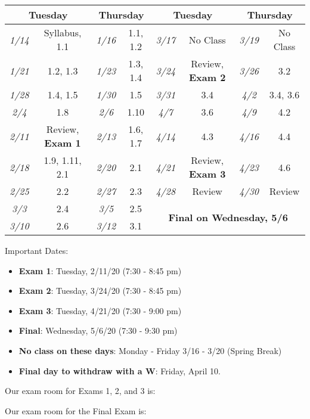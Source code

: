 \documentclass[notes]{subfiles}
\begin{document}
\begin{flushleft}
	\begin{center}
		\begin{tabular}{|c||c|c||c|c||c|c||c|}\hline
			\multicolumn{2}{|c|}{\textbf{Tuesday}} & \multicolumn{2}{c|}{\textbf{Thursday}} & \multicolumn{2}{c|}{\textbf{Tuesday}} & \multicolumn{2}{c|}{\textbf{Thursday}}\\ \hline

			\textit{1/14} & Syllabus, 1.1			&\textit{1/16} & 1.1, 1.2		&\textit{3/17}& No Class					&\textit{3/19}& No Class \\ \hline \hline
			\textit{1/21} & 1.2, 1.3				&\textit{1/23} & 1.3, 1.4		&\textit{3/24}& Review, \textbf{Exam 2}	&\textit{3/26}& 3.2\\ \hline \hline
			\textit{1/28} & 1.4, 1.5				&\textit{1/30} & 1.5			&\textit{3/31}& 3.4 						&\textit{4/2}& 3.4, 3.6\\ \hline \hline
			\textit{2/4} 	& 1.8 					&\textit{2/6}& 1.10			&\textit{4/7}	 & 3.6						&\textit{4/9}&  4.2\\ \hline \hline
			\textit{2/11} & Review, \textbf{Exam 1}	&\textit{2/13}& 1.6, 1.7 		&\textit{4/14}& 4.3 						&\textit{4/16}& 4.4	\\ \hline \hline
			\textit{2/18} & 1.9, 1.11, 2.1			&\textit{2/20}& 2.1			&\textit{4/21}& Review, \textbf{Exam 3}	&\textit{4/23}& 4.6 \\ \hline \hline
			\textit{2/25} & 2.2					&\textit{2/27} & 2.3			&\textit{4/28}& Review					&\textit{4/30}& Review\\ \hline \hline
			\textit{3/3}& 2.4						&\textit{3/5}& 2.5			&\multicolumn{4}{c|}{\multirow{2}{*}{\textbf{Final on Wednesday, 5/6}}}\\ \cline{1-4}\cline{1-4}
			\textit{3/10}& 2.6					&\textit{3/12}& 3.1  			&\multicolumn{4}{c|}{}\\ \hline 
		\end{tabular}
	\end{center}
	
	
	Important Dates:
	\begin{itemize}
		\item \textbf{Exam 1}: Tuesday, 2/11/20 (7:30 - 8:45 pm)
		\item \textbf{Exam 2}: Tuesday, 3/24/20 (7:30 - 8:45 pm)
		\item \textbf{Exam 3}: Tuesday, 4/21/20 (7:30 - 9:00 pm)
		\item \textbf{Final}: Wednesday, 5/6/20 (7:30 - 9:30 pm)
		\item \textbf{No class on these days}: Monday - Friday 3/16 - 3/20 (Spring Break)
		\item \textbf{Final day to withdraw with a W}: Friday, April 10.
	\end{itemize}
\end{flushleft}
	\vspace{50pt}
	
	\begin{center}
		\Large{Our exam room for Exams 1, 2, and 3 is}: \makebox[3in]{\hrulefill}
	\end{center}
		\vspace{30pt}
	\begin{center}
		\Large{Our exam room for the Final Exam is}: \makebox[3in]{\hrulefill}
	\end{center}
\end{document}
